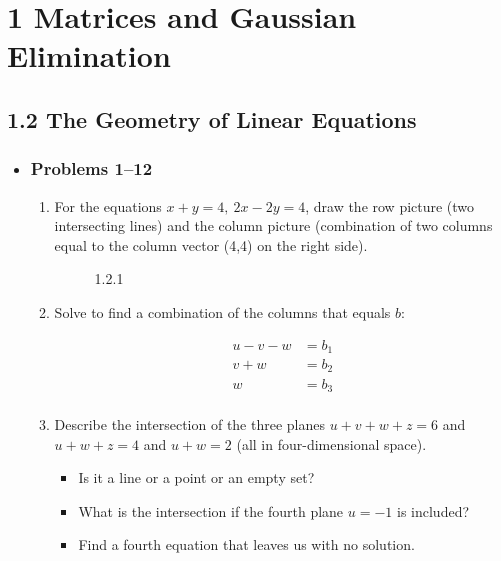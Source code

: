 \chapter{1 Matrices and Gaussian Elimination}

\section{1.2 The Geometry of Linear Equations}
\begin{itemize}
  \item []

  \subsection{Problems 1--12}
  \begin{enumerate}
    \item For the equations \( x + y = 4, ~ 2x - 2y = 4 \), draw the row picture (two
      intersecting lines) and the column picture (combination of two columns
      equal to the column vector (4,4) on the right side).

      \begin{figure}[ht]
          \centering
          \caption{1.2.1}
      \end{figure}

    \item Solve to find a combination of the columns that equals \(b\):

      \begin{align*}
        u - v - w &= b_1 \\
        v + w &= b_2 \\
        w &= b_3 \\
      \end{align*}

    \item Describe the intersection of the three planes \(  u+v+w+z = 6 \) and
      \( u+w+z = 4 \) and \( u+w = 2 \) (all in four-dimensional space).
      \begin{itemize}
        \item Is it a line or a point or an empty set?
        \item What is the intersection if the fourth plane \( u = -1 \) is included?
        \item Find a fourth equation that leaves us with no solution.
      \end{itemize}


\end{enumerate}
\end{itemize}
